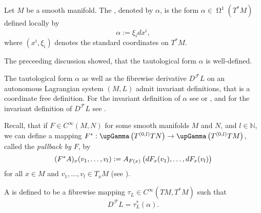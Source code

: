 \begin{definition}
	\label{def:tautological_form}
	Let $M$ be a smooth manifold. The , denoted by $\alpha$, is the form  $\alpha \in \upOmega^1(T^*M)$ defined locally by
	\begin{equation*}
		\alpha := \xi_idx^i,
	\end{equation*}
	\noindent where $(x^i,\xi_i)$ denotes the standard coordinates on $T^*M$.
\end{definition}

\begin{remark}
	The preceeding discussion showed, that the tautological form $\alpha$ is well-defined.
\end{remark}

\begin{remark}
	The tautological form $\alpha$ as well as the fibrewise derivative $D^\mathcal{F}L$ on an autonomous Lagrangian system $(M,L)$ admit invariant definitions, that is a coordinate free definition. For the invariant definition of $\alpha$ see \cite[569]{lee:smooth_manifolds:2013} or \cite[10--11]{silva:SG:2008}, and for the invariant definition of $D^\mathcal{F}L$ see \cite[31]{takhtajan:QM:2008}. 
\end{remark}

Recall, that if $F \in C^\infty(M,N)$ for some smooth manifolds $M$ and $N$, and $l \in \mathbb{N}$, we can define a mapping $F^* : \upGamma\del[1]{T^{(0,l)}TN} \to  \upGamma\del[1]{T^{(0,l)}TM}$, called the \emph{pullback by $F$}, by
\begin{equation*}
	(F^*A)_x(v_1,\dots,v_l) := A_{F(x)}\del[1]{dF_x(v_1),\dots,dF_x(v_l)}
\end{equation*}
\noindent for all $x \in M$ and $v_1,\dots,v_l \in T_xM$ (see \cite[320]{lee:smooth_manifolds:2013}).

\begin{definition}
	\label{def:Legendre_transform}
	A  is defined to be a fibrewise mapping $\tau_L \in C^\infty(TM,T^*M)$ such that
	\begin{equation*}
		D^\mathcal{F}L = \tau_L^*(\alpha).
	\end{equation*}
\end{definition}

